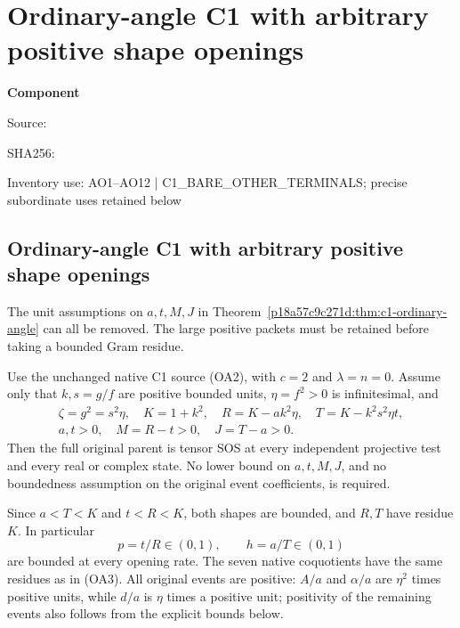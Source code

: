\chapter{Ordinary-angle C1 with arbitrary positive shape openings}
\label{component:p64b054e815d0}
\noindent\textbf{Component }\par
{\small\noindent Source: \par}
{\small\noindent SHA256: \par}
{\small\noindent Inventory use: AO1–AO12 | C1\_\allowbreak{}BARE\_\allowbreak{}OTHER\_\allowbreak{}TERMINALS; precise subordinate uses retained below\par}
\medskip
\section{Ordinary-angle C1 with arbitrary positive shape openings}
\label{p64b054e815d0:sec:c1-arbitrary-openings}

The unit assumptions on $a,t,M,J$ in
Theorem~\ref{p18a57c9c271d:thm:c1-ordinary-angle} can all be removed. The large
positive packets must be retained before taking a bounded Gram residue.

\begin{theorem}
Use the unchanged native C1 source (OA2), with $c=2$ and
$\lambda=n=0$. Assume only that $k,s=g/f$ are positive bounded units,
$\eta=f^2>0$ is infinitesimal, and
\[
\begin{gathered}
 \zeta=g^2=s^2\eta,\quad K=1+k^2,\quad
 R=K-ak^2\eta,\quad T=K-k^2s^2\eta t,\\
 a,t>0,\quad M=R-t>0,\quad J=T-a>0.
\end{gathered}\tag{AO1}
\]
Then the full original parent is tensor SOS at every independent
projective test and every real or complex state. No lower bound on
$a,t,M,J$, and no boundedness assumption on the original event
coefficients, is required.
\end{theorem}

Since $a<T<K$ and $t<R<K$, both shapes are bounded, and $R,T$ have
residue $K$. In particular
\[
       p=t/R\in(0,1),\qquad h=a/T\in(0,1)              \tag{AO2}
\]
are bounded at every opening rate. The seven native coquotients have
the same residues as in (OA3). All original events are positive:
$A/a$ and $\alpha/a$ are $\eta^2$ times positive units, while
$d/a$ is $\eta$ times a positive unit; positivity of the remaining
events also follows from the explicit bounds below.

